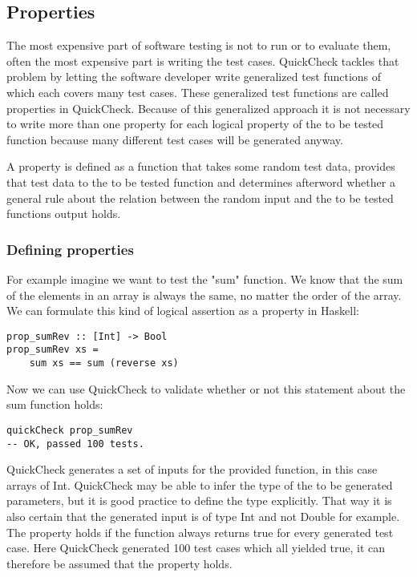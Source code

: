 \documentclass[a4paper, 12pt]{article} %
\begin{document}
\subsection{Properties}

The most expensive part of software testing is not to run or to evaluate them, often the most expensive part is writing the test cases. QuickCheck tackles that problem by letting the software developer write generalized test functions of which each covers many test cases. These generalized test functions are called properties in QuickCheck. \cite{Hughes2010} Because of this generalized approach it is not necessary to write more than one property for each logical property of the to be tested function because many different test cases will be generated anyway. \cite{Hughes2006}

A property is defined as a function that takes some random test data, provides that test data to the to be tested function and determines afterword whether a general rule about the relation between the random input and the to be tested functions output holds.

\subsubsection{Defining properties}

For example imagine we want to test the "sum" function. We know that the sum of the elements in an array is always the same, no matter the order of the array. We can formulate this kind of logical assertion as a property in Haskell:

\begin{verbatim}
prop_sumRev :: [Int] -> Bool
prop_sumRev xs = 
    sum xs == sum (reverse xs)
\end{verbatim}

Now we can use QuickCheck to validate whether or not this statement about the sum function holds:

\begin{verbatim}
quickCheck prop_sumRev
-- OK, passed 100 tests.
\end{verbatim}

QuickCheck generates a set of inputs for the provided function, in this case arrays of Int. QuickCheck may be able to infer the type of the to be generated parameters, but it is good practice to define the type explicitly. That way it is also certain that the generated input is of type Int and not Double for example. The property holds if the function always returns true for every generated test case. \cite{Claessen2000} Here QuickCheck generated 100 test cases which all yielded true, it can therefore be assumed that the property holds.
\end{document}
